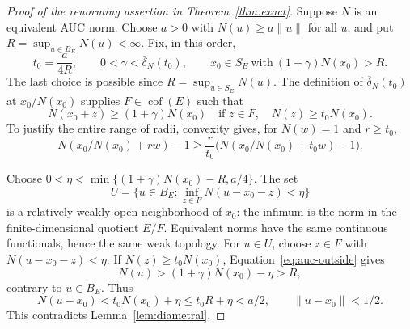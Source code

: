 \begin{proof}[Proof of the renorming assertion in Theorem~\ref{thm:exact}]
Suppose $N$ is an equivalent AUC norm.  Choose $a>0$ with
$N(u)\ge a\|u\|$ for all $u$, and put
$R=\sup_{u\in B_E}N(u)<\infty$.  Fix, in this order,
\[
 t_0=\frac{a}{4R},\qquad
 0<\gamma<\overline\delta_N(t_0),\qquad
 x_0\in S_E\ \text{with}\ (1+\gamma)N(x_0)>R.
\]
The last choice is possible since $R=\sup_{u\in S_E}N(u)$.
The definition of $\overline\delta_N(t_0)$ at $x_0/N(x_0)$ supplies
$F\in\operatorname{cof}(E)$ such that
\begin{equation}\label{eq:auc-outside}
 N(x_0+z)\ge(1+\gamma)N(x_0)
 \quad\text{if }z\in F,\quad N(z)\ge t_0N(x_0).
\end{equation}
To justify the entire range of radii, convexity gives, for $N(w)=1$ and
$r\ge t_0$,
\[
 N(x_0/N(x_0)+rw)-1
 \ge\frac r{t_0}\bigl(N(x_0/N(x_0)+t_0w)-1\bigr).
\]

Choose
$0<\eta<\min\{(1+\gamma)N(x_0)-R,a/4\}$.  The set
\[
 U=\{u\in B_E:\inf_{z\in F}N(u-x_0-z)<\eta\}
\]
is a relatively weakly open neighborhood of $x_0$: the infimum is the
norm in the finite-dimensional quotient $E/F$.  Equivalent norms have
the same continuous functionals, hence the same weak topology.
For $u\in U$, choose $z\in F$ with $N(u-x_0-z)<\eta$.
If $N(z)\ge t_0N(x_0)$, Equation~\eqref{eq:auc-outside} gives
\[
 N(u)>(1+\gamma)N(x_0)-\eta>R,
\]
contrary to $u\in B_E$.  Thus
\[
 N(u-x_0)<t_0N(x_0)+\eta\le t_0R+\eta<a/2,
 \qquad\|u-x_0\|<1/2.
\]
This contradicts Lemma~\ref{lem:diametral}.
\end{proof}
